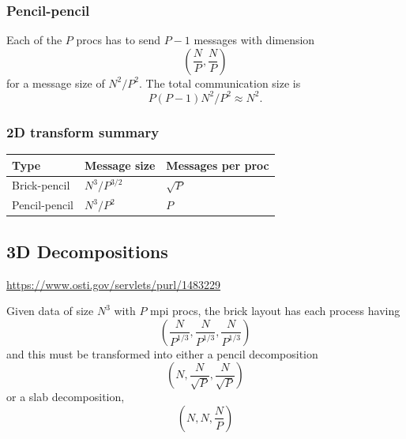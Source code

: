 \documentclass[12pt]{article}
\renewcommand{\(}{\left(}
\renewcommand{\)}{\right)}
\begin{document}
\subsubsection{Pencil-pencil}
Each of the $P$ procs has to send $P-1$ messages with dimension
\begin{dmath}
  \left(\frac{N}{P}, \frac{N}{P} \right)
\end{dmath}
for a message size of $N^2/P^2$.  The total communication size is
\begin{dmath}
  P \(P-1\) N^2/P^2\approx N^2.
\end{dmath}


\subsubsection{2D transform summary}

\begin{centering}
  \begin{table}[htbp]
    \begin{tabular}{|l|l|l|}
      \hline
      Type          & Message size  & Messages per proc \\
      \hline
      Brick-pencil  & $N^3/P^{3/2}$ & $\sqrt{P}$          \\
      Pencil-pencil & $N^3/P^2$ & $P$        \\
      \hline
    \end{tabular}
  \end{table}
\end{centering}




\subsection{3D Decompositions}

\url{https://www.osti.gov/servlets/purl/1483229}

Given data of size $N^3$ with $P$ mpi procs, the brick layout has
each process having
\begin{dmath}
  \label{brick3d}
  \left(\frac{N}{P^{1/3}}, \frac{N}{P^{1/3}}, \frac{N}{P^{1/3}} \right)
\end{dmath}
and this must be transformed into either a pencil decomposition
\begin{dmath}
  \label{pencil3d}
  \left(N, \frac{N}{\sqrt{P}}, \frac{N}{\sqrt{P}} \right)
\end{dmath}
or a slab decomposition,
\begin{dmath}
  \label{slab3d}
  \left(N, N, \frac{N}{P} \right)
\end{dmath}
\end{document}
